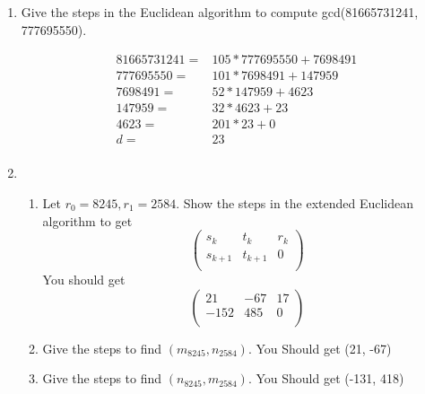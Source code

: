 \documentclass[11pt]{article}
\begin{document}
\begin{enumerate}
\newpage %
\item Give the steps in the Euclidean algorithm to compute gcd(81665731241, 777695550).

\begin{align*}
81665731241 =& 105 * 777695550 + 7698491\\
777695550 =& 101 * 7698491 + 147959\\
7698491 =& 52 * 147959 + 4623\\
147959 =& 32 * 4623 + 23\\
4623 =& 201 * 23 + 0\\
d =& 23\\
\end{align*}

\newpage %
\item 
\begin{enumerate}
\item Let $r_0 = 8245, r_1 = 2584$.  Show the steps in the extended Euclidean algorithm to get
\begin{equation*}
\left(
\begin{array}{ccc}
s_k & t_k & r_k \\
s_{k+1} & t_{k+1} & 0 \\
\end{array} \right)
\end{equation*}
You should get
\begin{equation*}
\left(
\begin{array}{ccc}
21 & -67 & 17 \\
-152 & 485 & 0 \\
\end{array} \right)
\end{equation*}
\item Give the steps to find $(m_{8245}, n_{2584})$.  You Should get (21, -67)
\item Give the steps to find $(n_{8245}, m_{2584})$.  You Should get (-131, 418)
\end{enumerate}



\end{enumerate}
\end{document}
